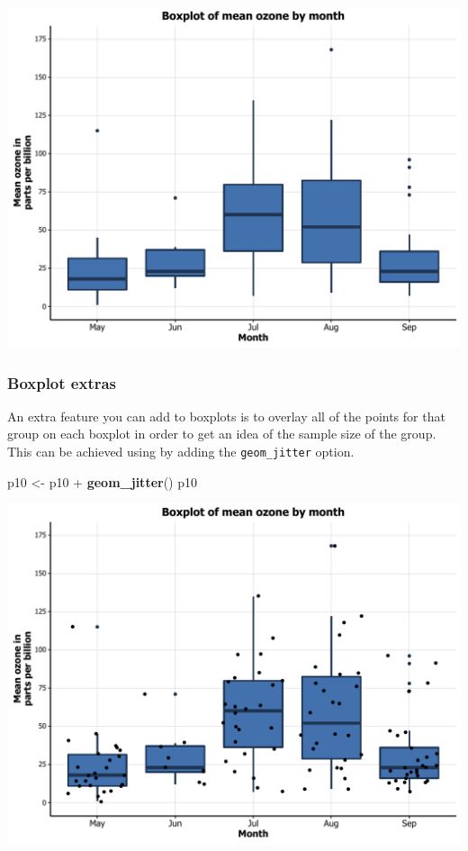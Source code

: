 \documentclass[]{article}
\newenvironment{Shaded}{\begin{snugshade}}{\end{snugshade}}
\newcommand{\KeywordTok}[1]{\textcolor[rgb]{0.13,0.29,0.53}{\textbf{{#1}}}}
\newcommand{\StringTok}[1]{\textcolor[rgb]{0.31,0.60,0.02}{{#1}}}
\newcommand{\NormalTok}[1]{{#1}}
\begin{document}
\begin{center}\includegraphics{0_all_posts_pdf/box_13-1} \end{center}

\subsubsection{Boxplot extras}\label{boxplot-extras}

An extra feature you can add to boxplots is to overlay all of the points
for that group on each boxplot in order to get an idea of the sample
size of the group. This can be achieved using by adding the
\texttt{geom\_jitter} option.

\begin{Shaded}
\begin{Highlighting}[]
\NormalTok{p10 <-}\StringTok{ }\NormalTok{p10 +}\StringTok{ }\KeywordTok{geom_jitter}\NormalTok{()}
\NormalTok{p10}
\end{Highlighting}
\end{Shaded}

\begin{center}\includegraphics{0_all_posts_pdf/box_14-1} \end{center}
\end{document}
